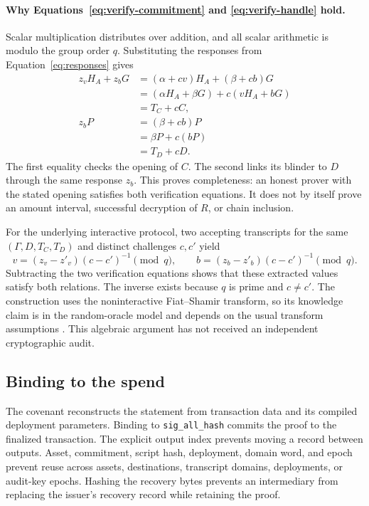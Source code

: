 \documentclass[11pt]{article}
\begin{document}
    \paragraph{Why Equations~\ref{eq:verify-commitment} and \ref{eq:verify-handle} hold.}
    Scalar multiplication distributes over addition, and all scalar arithmetic is modulo the group order $q$.
    Substituting the responses from Equation~\ref{eq:responses} gives
    \begin{align*}
        z_vH_A+z_bG
        &= (\alpha+cv)H_A+(\beta+cb)G\\
        &= (\alpha H_A+\beta G)+c(vH_A+bG)\\
        &= T_C+cC,\\[3pt]
        z_bP
        &= (\beta+cb)P\\
        &= \beta P+c(bP)\\
        &= T_D+cD.
    \end{align*}
    The first equality checks the opening of $C$.
    The second links its blinder to $D$ through the same response $z_b$.
    This proves completeness: an honest prover with the stated opening satisfies both verification equations.
    It does not by itself prove an amount interval, successful decryption of $R$, or chain inclusion.

    For the underlying interactive protocol, two accepting transcripts for the same $(\Gamma,D,T_C,T_D)$ and distinct challenges $c,c'$ yield
    \[
        v=(z_v-z'_v)(c-c')^{-1}\pmod q,\qquad
        b=(z_b-z'_b)(c-c')^{-1}\pmod q.
    \]
    Subtracting the two verification equations shows that these extracted values satisfy both relations.
    The inverse exists because $q$ is prime and $c\ne c'$.
    The construction uses the noninteractive Fiat--Shamir transform, so its knowledge claim is in the random-oracle model and depends on the usual transform assumptions \cite{faust-fiat-shamir}.
    This algebraic argument has not received an independent cryptographic audit.

    \subsection{Binding to the spend}

    The covenant reconstructs the statement from transaction data and its compiled deployment parameters.
    Binding to \texttt{sig\_all\_hash} commits the proof to the finalized transaction.
    The explicit output index prevents moving a record between outputs.
    Asset, commitment, script hash, deployment, domain word, and epoch prevent reuse across assets, destinations, transcript domains, deployments, or audit-key epochs.
    Hashing the recovery bytes prevents an intermediary from replacing the issuer's recovery record while retaining the proof.
\end{document}
